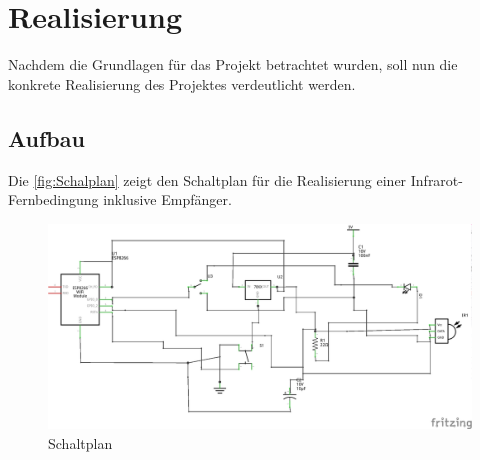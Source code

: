 
\section{Realisierung}
Nachdem die Grundlagen für das Projekt betrachtet wurden, soll nun die konkrete Realisierung des Projektes verdeutlicht werden.

\subsection{Aufbau}
Die \autoref{fig:Schalplan} zeigt den Schaltplan für die Realisierung einer Infrarot-Fernbedingung inklusive Empfänger.

\begin{figure}
	\centering
	\includegraphics[scale=1]{Abbildungen/ESP8266_Schaltplan}
	\caption{Schaltplan}
	\label{fig:Schalplan}
\end{figure}

